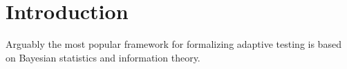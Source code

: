 \section{Introduction}

Arguably the most popular framework for formalizing adaptive testing is based on Bayesian statistics and information theory. 